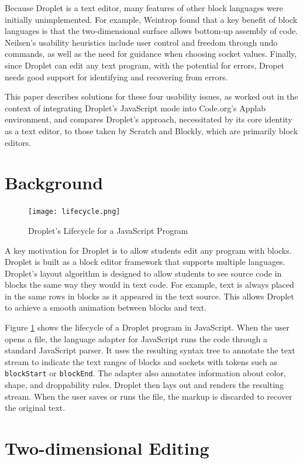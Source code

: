 \documentclass[conference]{IEEEtran}
\begin{document}
Because Droplet is a text editor, many features of other block languages were initially unimplemented. For example, Weintrop \cite{Weintrop} found that a key benefit of block languages is that the two-dimensional surface allows bottom-up assembly of code. Neilsen's usability heuristics \cite{Neilsen} include user control and freedom through undo commands, as well as the need for guidance when choosing socket values. Finally, since Droplet can edit any text program, with the potential for errors, Dropet needs good support for identifying and recovering from errors.

This paper describes solutions for these four usability issues, as worked out in the context of integrating Droplet's JavaScript mode into Code.org's Applab environment, and compares Droplet's approach, necessitated by its core identity as a text editor, to those taken by Scratch and Blockly, which are primarily block editors.

\section{Background}
\begin{figure}
\centering
\texttt{[image: lifecycle.png]}
\caption{Droplet's Lifecycle for a JavaScript Program}
\label{lifecycle}
\end{figure}

A key motivation for Droplet is to allow students edit any program with blocks. Droplet is built as a block editor framework that supports multiple languages. Droplet's layout algorithm is designed to allow students to see source code in blocks the same way they would in text code. For example, text is always placed in the same rows in blocks as it appeared in the text source. This allows Droplet to achieve a smooth animation between blocks and text.

Figure \ref{lifecycle} shows the lifecycle of a Droplet program in JavaScript. When the user opens a file, the language adapter for JavaScript runs the code through a standard JavaScript parser. It uses the resulting syntax tree to annotate the text stream to indicate the text ranges of blocks and sockets with tokens such as \texttt{blockStart} or \texttt{blockEnd}. The adapter also annotates information about color, shape, and droppability rules. Droplet then lays out and renders the resulting stream. When the user saves or runs the file, the markup is discarded to recover the original text.

\section{Two-dimensional Editing}
\end{document}
